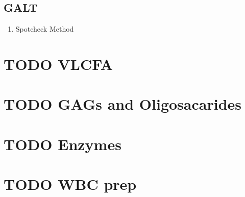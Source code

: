 \documentclass{scrartcl}
\begin{document}
\subsection{GALT}
\label{sec:org8079a0f}
\begin{enumerate}
\item Spotcheck Method
\label{sec:org0dcaaf3}




\end{enumerate}

\section{{\bfseries\sffamily TODO} VLCFA}
\label{sec:org36b5940}
\section{{\bfseries\sffamily TODO} GAGs and Oligosacarides}
\label{sec:orgd8414ac}
\section{{\bfseries\sffamily TODO} Enzymes}
\label{sec:org95b1551}
\section{{\bfseries\sffamily TODO} WBC prep}
\label{sec:org364be96}
\end{document}
